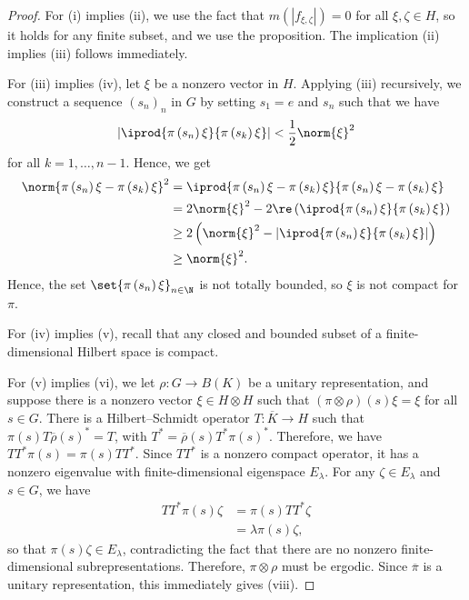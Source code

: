 \documentclass[10pt]{mypackage}
\begin{document}
\begin{proof}
  For (i) implies (ii), we use the fact that $m\left( \left\vert f_{\xi,\zeta} \right\vert \right) = 0$ for all $\xi,\zeta\in H$, so it holds for any finite subset, and we use the proposition. The implication (ii) implies (iii) follows immediately.

For (iii) implies (iv), let $\xi$ be a nonzero vector in $H$. Applying (iii) recursively, we construct a sequence $\left( s_n \right)_n$ in $G$ by setting $s_1 = e$ and $s_n$ such that we have
\begin{align*}
  \left\vert \iprod{\pi\left( s_n \right)\xi}{\pi\left( s_k \right)\xi} \right\vert < \frac{1}{2}\norm{\xi}^2
\end{align*}
for all $k = 1,\dots,n-1$. Hence, we get
\begin{align*}
  \norm{\pi\left( s_n \right)\xi-\pi\left( s_k \right)\xi}^2 &= \iprod{\pi\left( s_n \right)\xi-\pi\left( s_k \right)\xi}{\pi\left( s_n \right)\xi-\pi\left( s_k \right)\xi}\\
                                                             &= 2\norm{\xi}^2 - 2\re\left( \iprod{\pi\left( s_n \right)\xi}{\pi\left( s_k \right)\xi} \right)\\
                                                             &\geq 2\left( \norm{\xi}^2 - \left\vert \iprod{\pi\left( s_n \right)\xi}{\pi\left( s_k \right)\xi} \right\vert \right)\\
                                                             &\geq \norm{\xi}^2.
\end{align*}
Hence, the set $\set{\pi\left( s_n \right)\xi}_{n\in \N}$ is not totally bounded, so $\xi$ is not compact for $\pi$.

For (iv) implies (v), recall that any closed and bounded subset of a finite-dimensional Hilbert space is compact.

For (v) implies (vi), we let $\rho\colon G\rightarrow B\left( K \right)$ be a unitary representation, and suppose there is a nonzero vector $\xi\in H\otimes H$ such that $\left( \pi\otimes\rho \right)(s)\xi = \xi$ for all $s\in G$. There is a Hilbert--Schmidt operator $T\colon \overline{K}\rightarrow H $ such that $\pi(s) T \overline{\rho}(s)^{\ast} = T$, with $T^{\ast} = \overline{\rho}(s)T^{\ast}\pi(s)^{\ast}$. Therefore, we have $TT^{\ast}\pi(s) = \pi(s)TT^{\ast}$. Since $TT^{\ast}$ is a nonzero compact operator, it has a nonzero eigenvalue with finite-dimensional eigenspace $E_{\lambda}$. For any $\zeta\in E_{\lambda}$ and $s\in G$, we have
\begin{align*}
  TT^{\ast}\pi(s)\zeta &= \pi(s)TT^{\ast}\zeta\\
                       &= \lambda\pi(s)\zeta,
\end{align*}
so that $\pi(s)\zeta\in E_{\lambda}$, contradicting the fact that there are no nonzero finite-dimensional subrepresentations. Therefore, $\pi\otimes\rho$ must be ergodic. Since $ \overline{\pi} $ is a unitary representation, this immediately gives (viii).


\end{proof}
\end{document}
